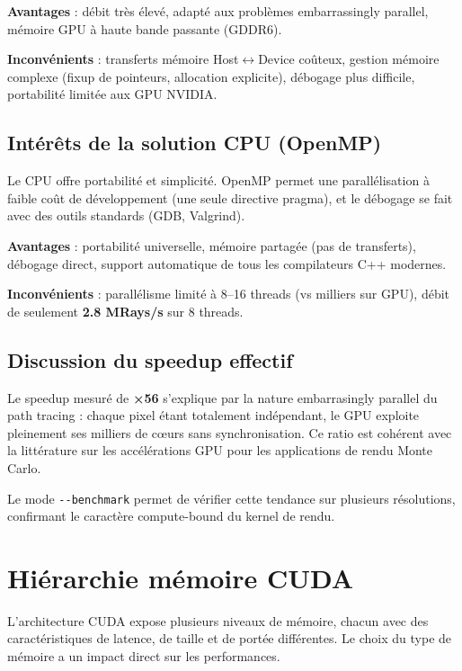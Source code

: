 \documentclass[12pt,a4paper]{article}
\begin{document}
\textbf{Avantages} : débit très élevé, adapté aux problèmes embarrassingly parallel,
mémoire GPU à haute bande passante (GDDR6).

\textbf{Inconvénients} : transferts mémoire Host$\leftrightarrow$Device coûteux, gestion mémoire
complexe (fixup de pointeurs, allocation explicite), débogage plus difficile,
portabilité limitée aux GPU NVIDIA.

\subsection{Intérêts de la solution CPU (OpenMP)}

Le CPU offre portabilité et simplicité. OpenMP permet une parallélisation
à faible coût de développement (une seule directive pragma), et le débogage
se fait avec des outils standards (GDB, Valgrind).

\textbf{Avantages} : portabilité universelle, mémoire partagée (pas de transferts),
débogage direct, support automatique de tous les compilateurs C++ modernes.

\textbf{Inconvénients} : parallélisme limité à 8--16 threads (vs milliers sur GPU),
débit de seulement \textbf{2.8 MRays/s} sur 8 threads.

\subsection{Discussion du speedup effectif}

Le speedup mesuré de \textbf{×56} s'explique par la nature embarrasingly parallel
du path tracing : chaque pixel étant totalement indépendant, le GPU exploite pleinement
ses milliers de cœurs sans synchronisation. Ce ratio est cohérent avec la littérature
sur les accélérations GPU pour les applications de rendu Monte Carlo.

Le mode \texttt{-{}-benchmark} permet de vérifier cette tendance sur plusieurs résolutions,
confirmant le caractère compute-bound du kernel de rendu.

\section{Hiérarchie mémoire CUDA}

L'architecture CUDA expose plusieurs niveaux de mémoire, chacun avec des caractéristiques
de latence, de taille et de portée différentes. Le choix du type de mémoire a un impact
direct sur les performances.
\end{document}
